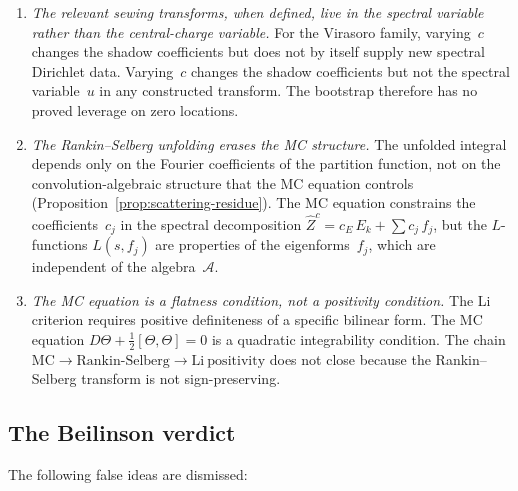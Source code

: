 \documentclass[11pt]{article}
\newcommand{\cA}{\mathcal{A}}
\begin{document}
\begin{enumerate}
\item \emph{The relevant sewing transforms, when defined, live in
the spectral variable rather than the central-charge variable.}
For the Virasoro family, varying~$c$ changes the shadow
coefficients but does not by itself supply new spectral
Dirichlet data.
Varying~$c$ changes the shadow coefficients but not the
spectral variable~$u$ in any constructed transform.  The
bootstrap therefore has no proved leverage on zero locations.

\item \emph{The Rankin--Selberg unfolding erases the MC
structure.}  The unfolded integral depends only on the
Fourier coefficients of the partition function, not on the
convolution-algebraic structure that the MC equation controls
(Proposition~\ref{prop:scattering-residue}).  The MC equation
constrains the coefficients~$c_j$ in the spectral
decomposition $\hat{Z}^c = c_E\, E_k + \sum c_j\, f_j$,
but the $L$-functions $L(s, f_j)$ are properties of the
eigenforms~$f_j$, which are independent of the algebra~$\cA$.

\item \emph{The MC equation is a flatness condition, not a
positivity condition.}  The Li criterion requires positive
definiteness of a specific bilinear form.  The MC equation
$D\Theta + \tfrac{1}{2}[\Theta, \Theta] = 0$ is a quadratic
integrability condition.  The chain
$\mathrm{MC} \to \mathrm{Rankin\text{-}Selberg}
\to \mathrm{Li\ positivity}$ does not close because the
Rankin--Selberg transform is not sign-preserving.
\end{enumerate}

\subsection{The Beilinson verdict}

The following false ideas are dismissed:
\end{document}
